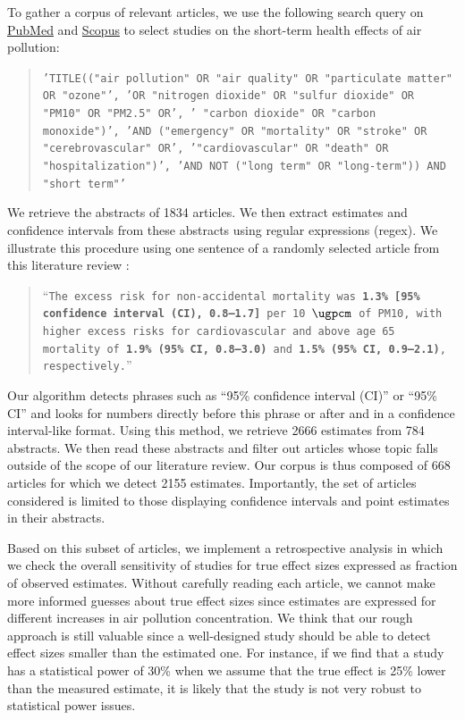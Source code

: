 \documentclass[12pt]{article}
\begin{document}
       To gather a corpus of relevant articles, we use the following search query on \href{https://www.ncbi.nlm.nih.gov/}{PubMed} and \href{https://www.scopus.com/home.uri}{Scopus} to select studies on the short-term health effects of air pollution:
               
        \begin{quote}
       \footnotesize\texttt{'TITLE(("air pollution" OR "air quality" OR "particulate matter" OR "ozone"', 'OR "nitrogen dioxide" OR "sulfur dioxide" OR "PM10" OR "PM2.5" OR', ' "carbon dioxide" OR "carbon monoxide")',  'AND ("emergency" OR "mortality" OR "stroke" OR "cerebrovascular" OR', '"cardiovascular" OR "death" OR "hospitalization")', 'AND NOT ("long term" OR "long-term")) AND "short term"'}
        \end{quote}

       \noindent We retrieve the abstracts of 1834 articles. We then extract estimates and confidence intervals from these abstracts using regular expressions (regex). We illustrate this procedure using one sentence of a randomly selected article from this literature review \citep{vichit-vadakan_public_2008}:
        
        \begin{quote}
         \footnotesize    “\texttt{The excess risk for non-accidental mortality was \textbf{\color{cerulean}1.3\% [95\% confidence interval (CI), 0.8–1.7]} per 10 $\si{\ugpcm}$ of PM10, with higher excess risks for cardiovascular and above age 65 mortality of \textbf{\color{cerulean}1.9\% (95\% CI, 0.8–3.0)} and \textbf{\color{cerulean}1.5\% (95\% CI, 0.9–2.1)}, respectively.}”
        \end{quote}
        
        \noindent Our algorithm detects phrases such as “95\% confidence interval (CI)” or “95\% CI” and looks for numbers directly before this phrase or after and in a confidence interval-like format. Using this method, we retrieve 2666 estimates from 784 abstracts. We then read these abstracts and filter out articles whose topic falls outside of the scope of our literature review. Our corpus is thus composed of 668 articles for which we detect 2155 estimates. Importantly, the set of articles considered is limited to those displaying confidence intervals and point estimates in their abstracts.

        Based on this subset of articles, we implement a retrospective analysis in which we check the overall sensitivity of studies for true effect sizes expressed as fraction of observed estimates. Without carefully reading each article, we cannot make more informed guesses about true effect sizes since estimates are expressed for different increases in air pollution concentration. We think that our rough approach is still valuable since a well-designed study should be able to detect effect sizes smaller than the estimated one. For instance, if we find that a study has a statistical power of 30\% when we assume that the true effect is 25\% lower than the measured estimate, it is likely that the study is not very robust to statistical power issues.
        
\end{document}
